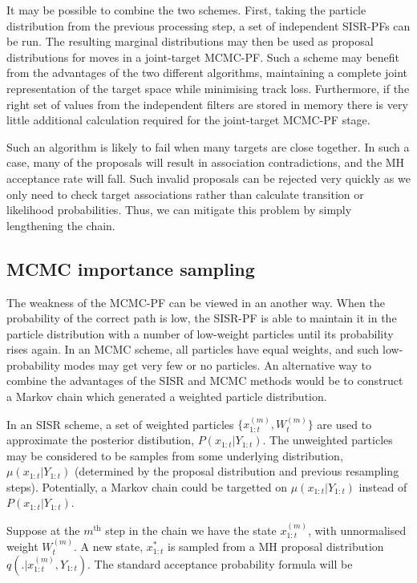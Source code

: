 It may be possible to combine the two schemes. First, taking the particle distribution from the previous processing step, a set of independent SISR-PFs can be run. The resulting marginal distributions may then be used as proposal distributions for moves in a joint-target MCMC-PF. Such a scheme may benefit from the advantages of the two different algorithms, maintaining a complete joint representation of the target space while minimising track loss. Furthermore, if the right set of values from the independent filters are stored in memory there is very little additional calculation required for the joint-target MCMC-PF stage.

Such an algorithm is likely to fail when many targets are close together. In such a case, many of the proposals will result in association contradictions, and the MH acceptance rate will fall. Such invalid proposals can be rejected very quickly as we only need to check target associations rather than calculate transition or likelihood probabilities. Thus, we can mitigate this problem by simply lengthening the chain.



\subsection{MCMC importance sampling}
The weakness of the MCMC-PF can be viewed in an another way. When the probability of the correct path is low, the SISR-PF is able to maintain it in the particle distribution with a number of low-weight particles until its probability rises again. In an MCMC scheme, all particles have equal weights, and such low-probability modes may get very few or no particles. An alternative way to combine the advantages of the SISR and MCMC methods would be to construct a Markov chain which generated a weighted particle distribution.

In an SISR scheme, a set of weighted particles $\{ x_{1:t}^{(m)}, W_t^{(m)} \}$ are used to approximate the posterior distibution, $P(x_{1:t}|Y_{1:t})$. The unweighted particles may be considered to be samples from some underlying distribution, $\mu(x_{1:t}|Y_{1:t})$ (determined by the proposal distribution and previous resampling steps). Potentially, a Markov chain could be targetted on $\mu(x_{1:t}|Y_{1:t})$ instead of $P(x_{1:t}|Y_{1:t})$.

Suppose at the $m^{\text{th}}$ step in the chain we have the state $x_{1:t}^{(m)}$, with unnormalised weight $W_t^{(m)}$. A new state, $x_{1:t}^{*}$ is sampled from a MH proposal distribution $q(.|x_{1:t}^{(m)}, Y_{1:t})$. The standard acceptance probability formula will be

